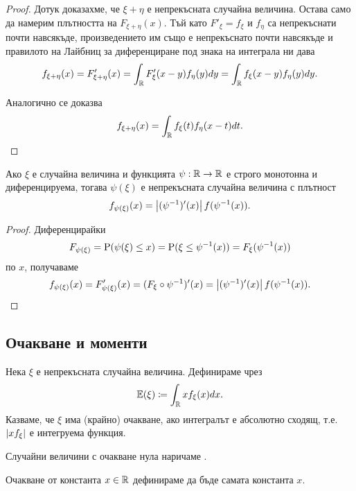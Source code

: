 \documentclass[numbers=endperiod, bibliography=totocnumbered]{scrartcl}
\begin{document}
\begin{proof}
  Дотук доказахме, че \( \xi + \eta \) е непрекъсната случайна величина. Остава само да намерим плътността на \( F_{\xi + \eta}(x) \). Тъй като \( F'_\xi = f_\xi \) и \( f_\eta \) са непрекъснати почти навсякъде, произведението им също е непрекъснато почти навсякъде и правилото на Лайбниц за диференциране под знака на интеграла ни дава
  \begin{align*}
    f_{\xi + \eta} (x)
    =
    F'_{\xi + \eta} (x)
    =
    \int_{\mathbb{R}} F'_\xi(x - y) f_\eta(y) dy
    =
    \int_{\mathbb{R}} f_\xi(x - y) f_\eta(y) dy.
  \end{align*}

  Аналогично се доказва
  \begin{align*}
    f_{\xi + \eta} (x)
    =
    \int_{\mathbb{R}} f_\xi(t) f_\eta(x - t) dt.
  \end{align*}
\end{proof}

\begin{proposition}\label{thm:density_of_transformed_variable}
  Ако \( \xi \) е случайна величина и функцията \( \psi: \mathbb{R} \to \mathbb{R} \) е строго монотонна и диференцируема, тогава \( \psi(\xi) \) е непрекъсната случайна величина с плътност
  \begin{align*}
    f_{\psi(\xi)} (x)
    =
    \left\vert (\psi^{-1})'(x) \right\vert f(\psi^{-1}(x)).
  \end{align*}
\end{proposition}
\begin{proof} Диференцирайки
  \begin{align*}
    F_{\psi(\xi)} = \operatorname{P}(\psi(\xi) \leq x) = \operatorname{P}(\xi \leq \psi^{-1}(x)) = F_\xi(\psi^{-1}(x))
  \end{align*}
  по \( x \), получаваме
  \begin{align*}
    f_{\psi(\xi)} (x)
    =
    F'_{\psi(\xi)} (x)
    =
    (F_{\xi} \circ \psi^{-1})'(x)
    =
    \left\vert (\psi^{-1})'(x) \right\vert f(\psi^{-1}(x)).
  \end{align*}
\end{proof}

\subsection{Очакване и моменти}

\begin{definition}
  Нека \( \xi \) е непрекъсната случайна величина. Дефинираме  чрез
  \begin{align*}
    \mathbb{E}(\xi) \coloneqq \int_{\mathbb{R}} x f_\xi(x) dx.
  \end{align*}
  Казваме, че \( \xi \) има (крайно) очакване, ако интегралът е абсолютно сходящ, т.е. \( \left\vert x f_\xi \right\vert \) е интегруема функция.

  Случайни величини с очакване нула наричаме .

  Очакване от константа \( x \in \mathbb{R} \) дефинираме да бъде самата константа \( x \).
\end{definition}
\end{document}
